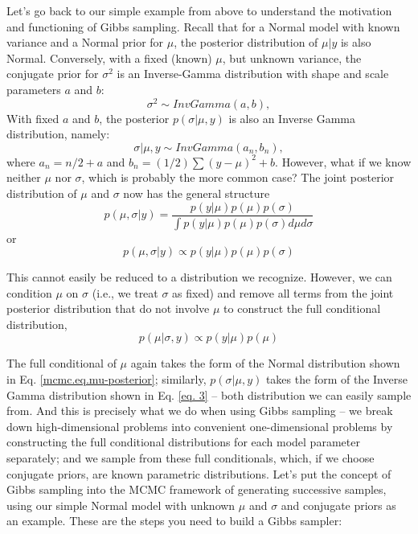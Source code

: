 Let's go back to our
simple example from above to understand the motivation and functioning
of Gibbs sampling. Recall that for a Normal model with known variance
and a Normal prior for $\mu$, the posterior distribution of $\mu|y$ is also
Normal. Conversely, with a fixed (known) $\mu$, but unknown variance, the
conjugate prior for $\sigma^2$ is an Inverse-Gamma distribution with shape and scale parameters $a$ and $b$:
\[
\sigma^2 \sim InvGamma(a,b),
\]
With fixed $a$ and $b$, the posterior $p(\sigma|\mu,y)$ is also an Inverse Gamma distribution, namely:
\begin{equation}
\sigma|\mu,y \sim InvGamma (a_n, b_n),
\label{eq. 3}
\end{equation}
 where  $a_n = n/2   + a$ and $b_n = (1/2) \sum (y-\mu)^2 + b$.
However, what if we know neither $\mu$ nor $\sigma$, which is probably the
more common case? The joint posterior distribution of $\mu$ and $\sigma$
now has the general structure
\[
p(\mu, \sigma|y) = \frac{p(y|\mu) p(\mu) p(\sigma)}{ \int p(y|\mu) p(\mu) p(\sigma) d\mu d\sigma }
\]
or
\[
p(\mu, \sigma|y) \propto p(y|\mu) p(\mu) p(\sigma)
\]

This cannot easily be reduced to a distribution we recognize. However,
we can condition $\mu$ on $\sigma$ (i.e., we treat $\sigma$ as fixed) and remove
all terms from the joint posterior distribution that do not involve $\mu$
to construct the full conditional distribution,
\[
p(\mu|\sigma,y)  \propto p(y|\mu) p(\mu)
\]

The full conditional of $\mu$ again takes the form of the Normal
distribution shown in Eq. \ref{mcmc.eq.mu-posterior}; similarly, $p(\sigma|\mu,y)$ takes
the form of the Inverse Gamma distribution shown in
Eq. \ref{eq. 3}  – both distribution we can easily sample
from. And this is precisely what we do when using Gibbs sampling – we
break down high-dimensional problems into convenient one-dimensional
problems by constructing the full conditional distributions for each
model parameter separately; and we sample from these full
conditionals, which, if we choose conjugate priors, are known
parametric distributions.
Let's put the concept of Gibbs sampling into the MCMC framework of
generating successive samples, using our simple Normal model with
unknown $\mu$ and $\sigma$ and conjugate priors as an example. These are the
steps you need to build a Gibbs sampler:

